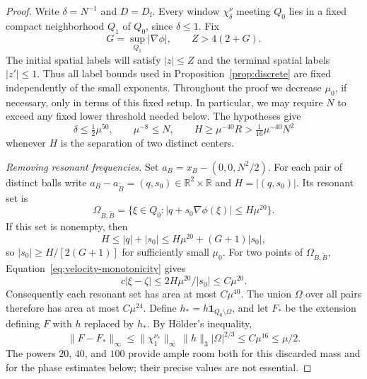 \begin{proof}
Write $\delta=N^{-1}$ and $D=D_{\mathrm f}$.  Every window
$\chi_\delta^\nu$ meeting $Q_0$ lies in a fixed compact neighborhood
$Q_1$ of $Q_0$, since $\delta\leq1$.  Fix
\[
 G=\sup_{Q_1}|\nabla\phi|,\qquad Z>4(2+G).
\]
The initial spatial labels will satisfy $|z|\leq Z$ and the terminal
spatial labels $|z'|\leq1$.  Thus all label bounds used in
Proposition~\ref{prop:discrete} are fixed independently of the small
exponents.  Throughout the proof we decrease $\mu_0$, if necessary,
only in terms of this fixed setup.  In particular, we may require $N$
to exceed any fixed lower threshold needed below.  The hypotheses give
\begin{equation}\label{eq:sparse-scale}
 \delta\leq\tfrac12\mu^{50},\qquad
 \mu^{-8}\leq N,\qquad
 H\geq\mu^{-40}R>\tfrac1{16}\mu^{-40}N^2
\end{equation}
whenever $H$ is the separation of two distinct centers.

\emph{Removing resonant frequencies.}
Set $a_B=x_B-(0,0,N^2/2)$.  For each pair of distinct balls write
$a_B-a_{\widetilde B}=(q,s_0)\in\mathbb R^2\times\mathbb R$ and
$H=|(q,s_0)|$.  Its resonant set is
\[
 \Omega_{B,\widetilde B}
 =\{\xi\in Q_0:|q+s_0\nabla\phi(\xi)|\leq H\mu^{20}\}.
\]
If this set is nonempty, then
\[
 H\leq |q|+|s_0|
 \leq H\mu^{20}+(G+1)|s_0|,
\]
so $|s_0|\geq H/[2(G+1)]$ for sufficiently small $\mu_0$.
For two points of $\Omega_{B,\widetilde B}$,
Equation~\eqref{eq:velocity-monotonicity} gives
\[
 c|\xi-\zeta|
 \leq 2H\mu^{20}/|s_0|\leq C\mu^{20}.
\]
Consequently each resonant set has area at most $C\mu^{40}$.
The union $\Omega$ over all pairs therefore has area at most
$C\mu^{24}$.  Define $h_*=h\mathbf1_{Q_0\setminus\Omega}$, and let
$F_*$ be the extension defining $F$ with $h$ replaced by $h_*$.  By
H\"older's inequality,
\begin{equation}\label{eq:sparse-excision}
 \|F-F_*\|_\infty
 \leq \|\chi_1^{\nu_*}\|_\infty\,\|h\|_3|\Omega|^{2/3}
 \leq C\mu^{16}\leq\mu/2.
\end{equation}
The powers $20$, $40$, and $100$ provide ample room both for this
discarded mass and for the phase estimates below; their precise values
are not essential.


\end{proof}
